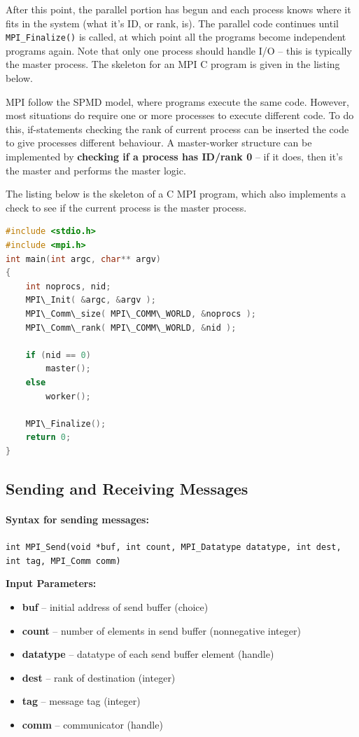 \documentclass{article}
\begin{document}
After this point, the parallel portion has begun and each process knows where it fits in the system (what it's ID, or rank, is). The parallel code continues until \texttt{MPI\_Finalize()} is called, at which point all the programs become independent programs again. Note that only one process should handle I/O -- this is typically the master process. The skeleton for an MPI C program is given in the listing below.

MPI follow the SPMD model, where programs execute the same code. However, most situations do require one or more processes to execute different code. To do this, if-statements checking the rank of current process can be inserted the code to give processes different behaviour. A master-worker structure can be implemented by \textbf{checking if a process has ID/rank 0} -- if it does, then it's the master and performs the master logic.

The listing below is the skeleton of a C MPI program, which also implements a check to see if the current process is the master process.
\begin{lstlisting}[language=C,frame=single]
#include <stdio.h>
#include <mpi.h>
int main(int argc, char** argv)
{
	int noprocs, nid;
	MPI\_Init( &argc, &argv );
	MPI\_Comm\_size( MPI\_COMM\_WORLD, &noprocs );
	MPI\_Comm\_rank( MPI\_COMM\_WORLD, &nid );

	if (nid == 0)
		master();
	else
		worker();

	MPI\_Finalize();
	return 0;
}
\end{lstlisting}

\subsection{Sending and Receiving Messages}

\paragraph{Syntax for sending messages:}
\texttt{int MPI\_Send(void *buf, int count, MPI\_Datatype datatype, int dest, int tag, MPI\_Comm comm)}

\textbf{Input Parameters:}
\begin{itemize}
	\item \textbf{buf} -- initial address of send buffer (choice)
	\item \textbf{count} -- number of elements in send buffer (nonnegative integer)
	\item \textbf{datatype} -- datatype of each send buffer element (handle)
	\item \textbf{dest} -- rank of destination (integer)
	\item \textbf{tag} -- message tag (integer)
	\item \textbf{comm} -- communicator (handle)
\end{itemize}
\end{document}
